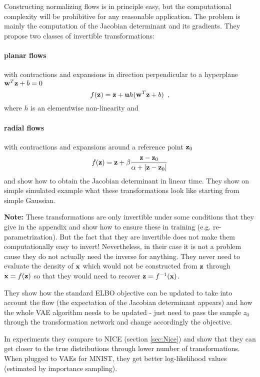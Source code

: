Constructing normalizing flows is in principle easy, but the computational complexity will be prohibitive for any reasonable application.
The problem is mainly the computation of the Jacobian determinant and its gradients.
They propose two classes of invertible transformations:
\paragraph{planar flows} with contractions and expansions in direction perpendicular to a hyperplane $\mathbf{w}^T \mathbf{z} + b = 0$
\begin{equation}
f(\mathbf{z}) = \mathbf{z} + \mathbf{u} h(\mathbf{w}^T \mathbf{z} + b) \enspace, 
\end{equation}
where $h$ is an elementwise non-linearity
and 
\paragraph{radial flows} with contractions and expansions around a reference point $\mathbf{z}_0$
\begin{equation}
f(\mathbf{z}) = \mathbf{z} + \beta \frac{\mathbf{z} - \mathbf{z}_0}{\alpha + \lvert \mathbf{z} - \mathbf{z}_0 \rvert}
\end{equation}
and show how to obtain the Jacobian determinant in linear time. 
They show on simple simulated example what these transformations look like starting from simple Gaussian.

\begin{notebox}
\textbf{Note:} These transformations are only invertible under some conditions that they give in the appendix and show how to ensure these in training (e.g. re-parametrization). But the fact that they are invertible does not make them computationally easy to invert! Nevertheless, in their case it is not a problem cause they do not actually need the inverse for anything. They never need to evaluate the density of $\mathbf{x}$ which would not be constructed from $\mathbf{z}$ through $\mathbf{x} = f(\mathbf{z})$ so that they would need to recover $\mathbf{z} = f^{-1}(\mathbf{x})$.
\end{notebox}

They show how the standard ELBO objective can be updated to take into account the flow (the expectation of the Jacobian determinant appears) and how the whole VAE algorithm needs to be updated - just need to pass the sample $z_0$ through the transformation network and change accordingly the objective.

In experiments they compare to NICE \parencite{dinhNICENonlinearIndependent2015} (section \ref{sec:Nice}) and show that they can get closer to the true distributions through lower number of transformations. When plugged to VAEs for MNIST, they get better log-likelihood values (estimated by importance sampling).

